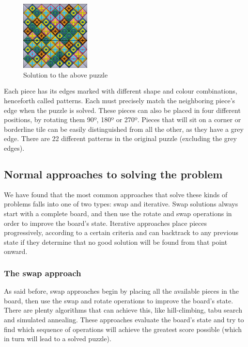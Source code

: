 \documentclass{llncs}
\begin{document}
\begin{figure}[h]
	\centering
	\includegraphics[width=35mm]{images/solved.png}
	\caption{Solution to the above puzzle}
	\label{fig:solved_example}
\end{figure}

Each piece has its edges marked with different shape and colour combinations, henceforth called patterns. Each must precisely match the neighboring piece's edge when the puzzle is solved. These pieces can also be placed in four different positions, by rotating them 90º, 180º or 270º. Pieces that will sit on a corner or borderline tile can be easily distinguished from all the other, as they have a grey edge. There are 22 different patterns in the original puzzle (excluding the grey edges).

\subsection{Normal approaches to solving the problem}\label{sec:normal_approaches}

We have found that the most common approaches that solve these kinds of problems falls into one of two types: swap and iterative. Swap solutions always start with a complete board, and then use the rotate and swap operations in order to improve the board's state. Iterative approaches place pieces progressively, according to a certain criteria and can backtrack to any previous state if they determine that no good solution will be found from that point onward.

\subsubsection{The swap approach}\label{sec:swap_approach}

As said before, swap approaches begin by placing all the available pieces in the board, then use the swap and rotate operations to improve the board's state. There are plenty algorithms that can achieve this, like hill-climbing, tabu search and simulated annealing. These approaches evaluate the board's state and try to find which sequence of operations will achieve the greatest score possible (which in turn will lead to a solved puzzle).
\end{document}
